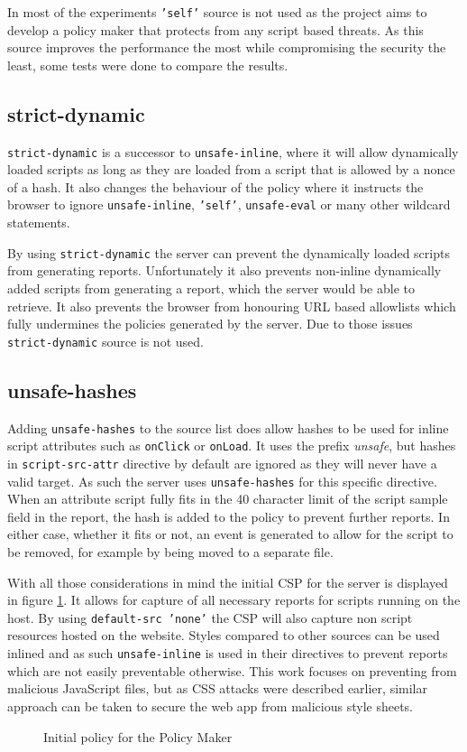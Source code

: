 In most of the experiments \texttt{'self'} source is not used as the project aims to develop a policy maker that protects from any script based threats.
As this source improves the performance the most while compromising the security the least, some tests were done to compare the results.

\subsection{strict-dynamic}

\texttt{strict-dynamic} is a successor to \texttt{unsafe-inline}, where it will allow dynamically loaded scripts as long as they are loaded from a script that is allowed by a nonce of a hash.
It also changes the behaviour of the policy where it instructs the browser to ignore \texttt{unsafe-inline}, \texttt{'self'}, \texttt{unsafe-eval} or many other wildcard statements.

By using \texttt{strict-dynamic} the server can prevent the dynamically loaded scripts from generating reports.
Unfortunately it also prevents non-inline dynamically added scripts from generating a report, which the server would be able to retrieve.
It also prevents the browser from honouring URL based allowlists which fully undermines the policies generated by the server.
Due to those issues \texttt{strict-dynamic} source is not used.

\subsection{unsafe-hashes}

Adding \texttt{unsafe-hashes} to the source list does allow hashes to be used for inline script attributes such as \texttt{onClick} or \texttt{onLoad}.
It uses the prefix {\it unsafe}, but hashes in \texttt{script-src-attr} directive by default are ignored as they will never have a valid target.
As such the server uses \texttt{unsafe-hashes} for this specific directive. 
When an attribute script fully fits in the 40 character limit of the script sample field in the report, the hash is added to the policy to prevent further reports.
In either case, whether it fits or not, an event is generated to allow for the script to be removed, for example by being moved to a separate file.

\vspace{10pt}

With all those considerations in mind the initial CSP for the server is displayed in figure \ref{code:initial}.
It allows for capture of all necessary reports for scripts running on the host.
By using \texttt{default-src 'none'} the CSP will also capture non script resources hosted on the website.
Styles compared to other sources can be used inlined and as such \texttt{unsafe-inline} is used in their directives to prevent reports which are not easily preventable otherwise.
This work focuses on preventing from malicious JavaScript files, but as CSS attacks were described earlier, similar approach can be taken to secure the web app from malicious style sheets.


\begin{figure}[h]

\caption{Initial policy for the Policy Maker}
	\label{code:initial}
\end{figure}
